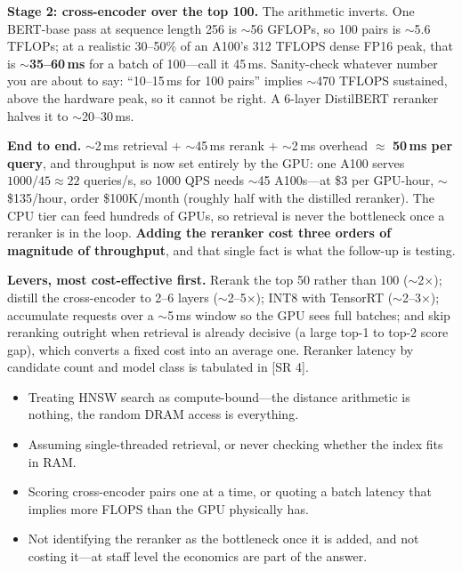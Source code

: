 \begin{interviewq}
\textbf{Stage 2: cross-encoder over the top 100.} The arithmetic inverts. One BERT-base pass at sequence length 256 is $\sim$56 GFLOPs, so 100 pairs is $\sim$5.6 TFLOPs; at a realistic 30--50\% of an A100's 312 TFLOPS dense FP16 peak, that is \textbf{$\sim$35--60\,ms} for a batch of 100---call it 45\,ms. Sanity-check whatever number you are about to say: ``10--15\,ms for 100 pairs'' implies $\sim$470 TFLOPS sustained, above the hardware peak, so it cannot be right. A 6-layer DistilBERT reranker halves it to $\sim$20--30\,ms.

\textbf{End to end.} $\sim$2\,ms retrieval $+$ $\sim$45\,ms rerank $+$ $\sim$2\,ms overhead $\approx$ \textbf{50\,ms per query}, and throughput is now set entirely by the GPU: one A100 serves $1000/45 \approx 22$ queries/s, so 1000 QPS needs $\sim$45 A100s---at \$3 per GPU-hour, $\sim$\$135/hour, order \$100K/month (roughly half with the distilled reranker). The CPU tier can feed hundreds of GPUs, so retrieval is never the bottleneck once a reranker is in the loop. \textbf{Adding the reranker cost three orders of magnitude of throughput}, and that single fact is what the follow-up is testing.

\textbf{Levers, most cost-effective first.} Rerank the top 50 rather than 100 ($\sim$2$\times$); distill the cross-encoder to 2--6 layers ($\sim$2--5$\times$); INT8 with TensorRT ($\sim$2--3$\times$); accumulate requests over a $\sim$5\,ms window so the GPU sees full batches; and skip reranking outright when retrieval is already decisive (a large top-1 to top-2 score gap), which converts a fixed cost into an average one. Reranker latency by candidate count and model class is tabulated in [SR 4].

\redflags
\begin{itemize}
    \item Treating HNSW search as compute-bound---the distance arithmetic is nothing, the random DRAM access is everything.
    \item Assuming single-threaded retrieval, or never checking whether the index fits in RAM.
    \item Scoring cross-encoder pairs one at a time, or quoting a batch latency that implies more FLOPS than the GPU physically has.
    \item Not identifying the reranker as the bottleneck once it is added, and not costing it---at staff level the economics are part of the answer.
\end{itemize}



\end{interviewq}
